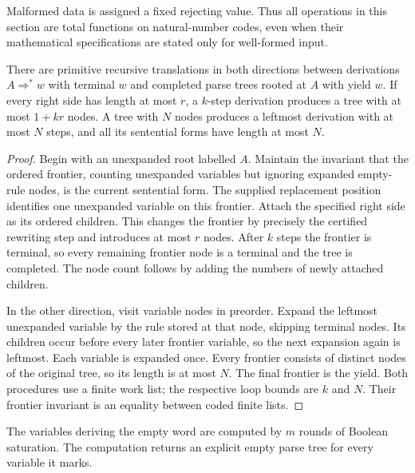 Malformed data is assigned a fixed rejecting value.  Thus all operations in
this section are total functions on natural-number codes, even when their
mathematical specifications are stated only for well-formed input.

\begin{theorem}
\label{cf:tree-derivation}
There are primitive recursive translations in both directions between
derivations $A\Rightarrow^* w$ with terminal $w$ and completed parse trees
rooted at $A$ with yield $w$.  If every right side has length at most $r$, a
$k$-step derivation produces a tree with at most $1+kr$ nodes.  A tree with
$N$ nodes produces a leftmost derivation with at most $N$ steps, and all its
sentential forms have length at most $N$.
\end{theorem}

\begin{proof}
Begin with an unexpanded root labelled $A$.  Maintain the invariant that the
ordered frontier, counting unexpanded variables but ignoring expanded
empty-rule nodes, is the current sentential form.  The supplied replacement
position identifies one unexpanded variable on this frontier.  Attach the
specified right side as its ordered children.  This changes the frontier
by precisely the certified rewriting step and introduces at most $r$
nodes.  After $k$ steps the frontier is terminal, so every remaining frontier
node is a terminal and the tree is completed.  The node count follows by
adding the numbers of newly attached children.

In the other direction, visit variable nodes in preorder.  Expand the
leftmost unexpanded variable by the rule stored at that node, skipping
terminal nodes.  Its children occur before every later frontier variable,
so the next expansion again is leftmost.  Each variable is expanded once.
Every frontier consists of distinct nodes of the original tree, so its
length is at most $N$.  The final frontier is the yield.  Both procedures
use a finite work list; the respective loop bounds are $k$ and $N$.
Their frontier invariant is an equality between coded finite lists.
\end{proof}

\begin{lemma}
\label{cf:nullable}
The variables deriving the empty word are computed by $m$ rounds of
Boolean saturation.  The computation returns an explicit empty parse tree
for every variable it marks.
\end{lemma}

